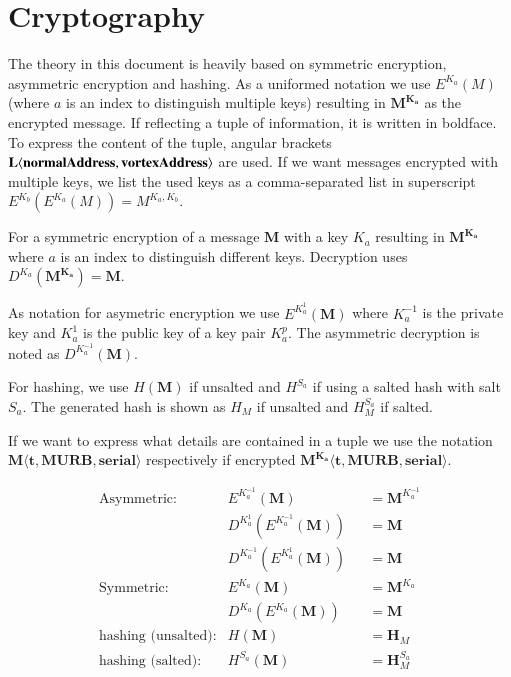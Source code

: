 \section{Cryptography \label{sec:encNot}}
The theory in this document is heavily based on symmetric encryption, asymmetric encryption and hashing. As a uniformed notation we use $E^{K_a}(M)$ (where $a$ is an index to distinguish multiple keys) resulting in $\mathbf{M^{K_a}}$ as the encrypted message. If reflecting a tuple of information, it is written in boldface. To express the content of the tuple, angular brackets $\splitatcommas{\mathbf{L\langle normalAddress,vortexAddress\rangle }}$ are used. If we want messages encrypted with multiple keys, we list the used keys as a comma-separated list in superscript $E^{K_b}\left(E^{K_a}\left(M\right)\right)=M^{{K_{a}},{K_b}}$.

For a symmetric encryption of a message $\mathbf{M}$ with a key $K_a$ resulting in $\mathbf{M^{K_a}}$ where $a$ is an index to distinguish different keys. Decryption uses $D^{K_a}(\mathbf{M^{K_a}})=\mathbf{M}$.

As notation for asymetric encryption we use $E^{K^{1}_a}(\mathbf{M})$ where $K^{-1}_a$ is the private key and $K^{1}_a$ is the public key of a key pair $K^p_a$. The asymmetric decryption is noted as $D^{K^{-1}_a}(\mathbf{M})$.

For hashing, we use $H(\mathbf{M})$ if unsalted and $H^{S_a}$ if using a salted hash with salt $S_a$. The generated hash is shown as $H_M$ if unsalted and $H^{S_a}_M$ if salted.

If we want to express what details are contained in a tuple we use the notation $\mathbf{M\langle t,MURB,serial\rangle }$ respectively if encrypted $\mathbf{M^{K_{a}}\langle t,MURB,serial\rangle}$.

\begin{align*}
	\text{Asymmetric:}         & E^{K^{-1}_a}\left(\mathbf{M}\right)                            && =\mathbf{M}^{K^{-1}_a}\\
	& D^{K^{1}_a}\left(E^{K^{-1}_a}\left(\mathbf{M}\right)\right)    && =\mathbf{M}\\
	& D^{K^{-1}_a}\left(E^{K^{1}_a}\left(\mathbf{M}\right)\right)    && =\mathbf{M}\\
	\text{Symmetric:}          & E^{K_a}\left(\mathbf{M}\right)                                 && =\mathbf{M}^{K_a}\\
	& D^{K_a}\left(E^{K_a}\left(\mathbf{M}\right)\right)          && =\mathbf{M}\\
	\text{hashing (unsalted):}& H\left(\mathbf{M}\right)                                       && =\mathbf{H}_M\\
	\text{hashing (salted):}  & H^{S_a}\left(\mathbf{M}\right)                                 && =\mathbf{H}^{S_a}_M
\end{align*}

